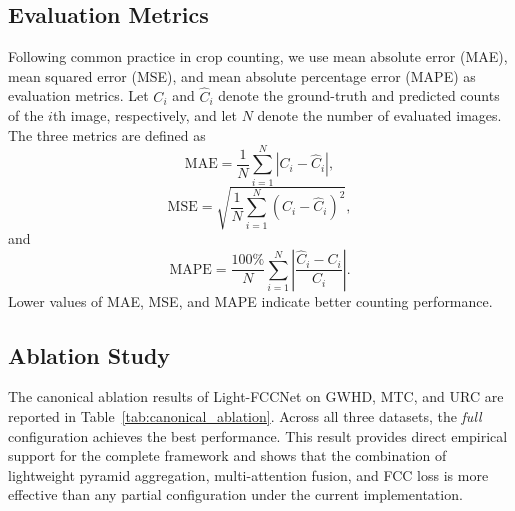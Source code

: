 \documentclass[a4paper,fleqn]{cas-sc}
\begin{document}
\subsection{Evaluation Metrics}

Following common practice in crop counting, we use mean absolute error (MAE), mean squared error (MSE), and mean absolute percentage error (MAPE) as evaluation metrics. Let $C_i$ and $\hat{C}_i$ denote the ground-truth and predicted counts of the $i$th image, respectively, and let $N$ denote the number of evaluated images. The three metrics are defined as
\begin{equation}
    \mathrm{MAE} = \frac{1}{N}\sum_{i=1}^{N}\left| C_i - \hat{C}_i \right|,
\end{equation}
\begin{equation}
    \mathrm{MSE} = \sqrt{\frac{1}{N}\sum_{i=1}^{N}\left( C_i - \hat{C}_i \right)^2},
\end{equation}
and
\begin{equation}
    \mathrm{MAPE} = \frac{100\%}{N}\sum_{i=1}^{N}\left| \frac{\hat{C}_i - C_i}{C_i} \right|.
\end{equation}
Lower values of MAE, MSE, and MAPE indicate better counting performance.

\subsection{Ablation Study}

The canonical ablation results of Light-FCCNet on GWHD, MTC, and URC are reported in Table~\ref{tab:canonical_ablation}. Across all three datasets, the \textit{full} configuration achieves the best performance. This result provides direct empirical support for the complete framework and shows that the combination of lightweight pyramid aggregation, multi-attention fusion, and FCC loss is more effective than any partial configuration under the current implementation.
\end{document}
